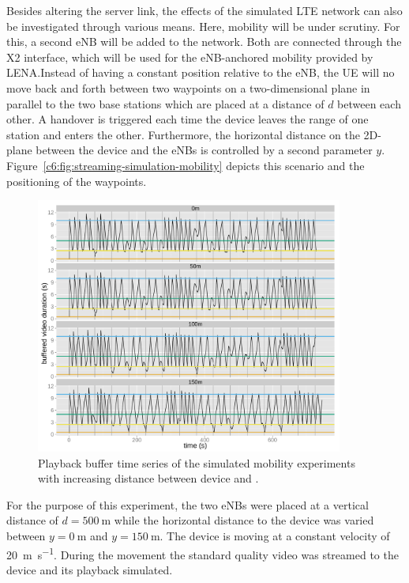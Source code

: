 Besides altering the server link, the effects of the simulated \gls{LTE} network can also be investigated through various means. Here, mobility will be under scrutiny. For this, a second \gls{eNB} will be added to the network. Both are connected through the X2 interface, which will be used for the \gls{eNB}-anchored mobility provided by LENA.\@ Instead of having a constant position relative to the \gls{eNB}, the \gls{UE} will no move back and forth between two waypoints on a two-dimensional plane in parallel to the two base stations which are placed at a distance of $d$ between each other. A handover is triggered each time the device leaves the range of one station and enters the other. Furthermore, the horizontal distance on the 2D-plane between the device and the \glspl{eNB} is controlled by a second parameter $y$. Figure~\ref{c6:fig:streaming-simulation-mobility} depicts this scenario and the positioning of the waypoints.

\begin{figure}[htb]
	\centering
	\includegraphics[width=0.9\textwidth]{images/R-ltesim-plotbuffer-mobility-facets.pdf}
	\caption{Playback buffer time series of the simulated mobility experiments with increasing distance between device and .}
\label{c6:fig:ltesim-mobility-plotbuffer-facets}
\end{figure}

For the purpose of this experiment, the two \glspl{eNB} were placed at a vertical distance of $d=\SI{500}{\meter}$ while the horizontal distance to the device was varied between $y=\SI{0}{\meter}$ and $y=\SI{150}{\meter}$. The device is moving at a constant velocity of \SI{20}{\meter\per\second}. During the movement the standard quality video was streamed to the device and its playback simulated. 

